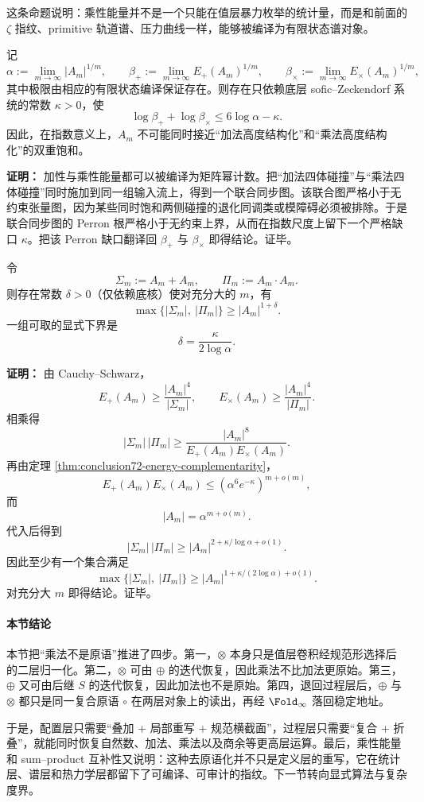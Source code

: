 这条命题说明：乘性能量并不是一个只能在值层暴力枚举的统计量，而是和前面的 \(\zeta\) 指纹、primitive 轨道谱、压力曲线一样，能够被编译为有限状态谱对象。

\begin{theorem}[加性与乘性能量的谱互补]\label{thm:conclusion72-energy-complementarity}
记
\[
\alpha:=\lim_{m\to\infty}|A_m|^{1/m},
\qquad
\beta_+:=\lim_{m\to\infty}E_+(A_m)^{1/m},
\qquad
\beta_\times:=\lim_{m\to\infty}E_\times(A_m)^{1/m},
\]
其中极限由相应的有限状态编译保证存在。则存在只依赖底层 sofic--Zeckendorf 系统的常数 \(\kappa>0\)，使
\[
\log \beta_+ + \log \beta_\times \le 6\log \alpha-\kappa.
\]
因此，在指数意义上，\(A_m\) 不可能同时接近“加法高度结构化”和“乘法高度结构化”的双重饱和。
\end{theorem}

\textbf{证明：}
加性与乘性能量都可以被编译为矩阵幂计数。把“加法四体碰撞”与“乘法四体碰撞”同时施加到同一组输入流上，得到一个联合同步图。该联合图严格小于无约束张量图，因为某些同时饱和两侧碰撞的退化同调类或模障碍必须被排除。于是联合同步图的 Perron 根严格小于无约束上界，从而在指数尺度上留下一个严格缺口 \(\kappa\)。把该 Perron 缺口翻译回 \(\beta_+\) 与 \(\beta_\times\) 即得结论。证毕。

\begin{corollary}\label{cor:conclusion73-sumproduct-exponential-law}
令
\[
\Sigma_m:=A_m+A_m,
\qquad
\Pi_m:=A_m\cdot A_m.
\]
则存在常数 \(\delta>0\)（仅依赖底核）使对充分大的 \(m\)，有
\[
\max\{|\Sigma_m|,\ |\Pi_m|\}\ge |A_m|^{1+\delta}.
\]
一组可取的显式下界是
\[
\delta=\frac{\kappa}{2\log \alpha}.
\]
\end{corollary}

\textbf{证明：}
由 Cauchy--Schwarz，
\[
E_+(A_m)\ge \frac{|A_m|^4}{|\Sigma_m|},
\qquad
E_\times(A_m)\ge \frac{|A_m|^4}{|\Pi_m|}.
\]
相乘得
\[
|\Sigma_m|\,|\Pi_m|
\ge
\frac{|A_m|^8}{E_+(A_m)E_\times(A_m)}.
\]
再由定理 \ref{thm:conclusion72-energy-complementarity}，
\[
E_+(A_m)E_\times(A_m)
\le
(\alpha^6 e^{-\kappa})^{m+o(m)},
\]
而
\[
|A_m|=\alpha^{m+o(m)}.
\]
代入后得到
\[
|\Sigma_m|\,|\Pi_m|
\ge
|A_m|^{2+\kappa/\log \alpha+o(1)}.
\]
因此至少有一个集合满足
\[
\max\{|\Sigma_m|,\ |\Pi_m|\}\ge |A_m|^{1+\kappa/(2\log \alpha)+o(1)}.
\]
对充分大 \(m\) 即得结论。证毕。

\paragraph{本节结论}
本节把“乘法不是原语”推进了四步。第一，\(\otimes\) 本身只是值层卷积经规范形选择后的二层归一化。第二，\(\otimes\) 可由 \(\oplus\) 的迭代恢复，因此乘法不比加法更原始。第三，\(\oplus\) 又可由后继 \(S\) 的迭代恢复，因此加法也不是原始。第四，退回过程层后，\(\oplus\) 与 \(\otimes\) 都只是同一复合原语 \(\circ\) 在两层对象上的读出，再经 \(\Fold_\infty\) 落回稳定地址。

于是，配置层只需要“叠加 + 局部重写 + 规范横截面”，过程层只需要“复合 + 折叠”，就能同时恢复自然数、加法、乘法以及商余等更高层运算。最后，乘性能量和 sum--product 互补性又说明：这种去原语化并不只是定义层的重写，它在统计层、谱层和热力学层都留下了可编译、可审计的指纹。下一节转向显式算法与复杂度界。

